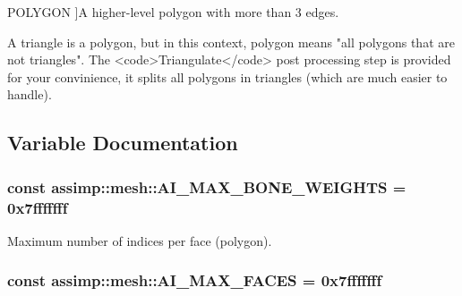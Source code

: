 \begin{Desc}
\begin{description}
{\hypertarget{namespaceassimp_1_1mesh_abc539dabedce7b606660c34e4bf55160af2d4e1983182975c6ddd3381ce1a256c}{P\+O\+L\+Y\+G\+O\+N}\label{namespaceassimp_1_1mesh_abc539dabedce7b606660c34e4bf55160af2d4e1983182975c6ddd3381ce1a256c}
}]A higher-\/level polygon with more than 3 edges. \begin{DoxyVerb} A triangle is a polygon, but in this context, polygon means
 "all polygons that are not triangles". The <code>Triangulate</code>
 post processing step is provided for your convinience, it splits all
 polygons in triangles (which are much easier to handle).\end{DoxyVerb}
 \end{description}
\end{Desc}


\subsection{Variable Documentation}
\hypertarget{namespaceassimp_1_1mesh_a4a1f672224d779fd1efe17eb221abe6d}{
\subsubsection[{A\+I\+\_\+\+M\+A\+X\+\_\+\+B\+O\+N\+E\+\_\+\+W\+E\+I\+G\+H\+T\+S}]{\setlength{\rightskip}{0pt plus 5cm}const assimp\+::mesh\+::\+A\+I\+\_\+\+M\+A\+X\+\_\+\+B\+O\+N\+E\+\_\+\+W\+E\+I\+G\+H\+T\+S = 0x7fffffff}}\label{namespaceassimp_1_1mesh_a4a1f672224d779fd1efe17eb221abe6d}
Maximum number of indices per face (polygon). \hypertarget{namespaceassimp_1_1mesh_af24975017b1715339c3a4c223e3a2def}{
\subsubsection[{A\+I\+\_\+\+M\+A\+X\+\_\+\+F\+A\+C\+E\+S}]{\setlength{\rightskip}{0pt plus 5cm}const assimp\+::mesh\+::\+A\+I\+\_\+\+M\+A\+X\+\_\+\+F\+A\+C\+E\+S = 0x7fffffff}}\label{namespaceassimp_1_1mesh_af24975017b1715339c3a4c223e3a2def}
